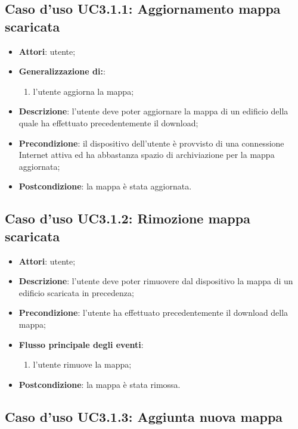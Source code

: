 \documentclass[../AnalisiDeiRequisiti.tex]{subfiles}
\begin{document}
\subsection{Caso d'uso UC3.1.1: Aggiornamento mappa scaricata}
\begin{itemize}
\item \textbf{Attori}: utente;

        \item \textbf{Generalizzazione di:}:
          \begin{enumerate}
          \item l'utente aggiorna la mappa;

      \end{enumerate}
\item \textbf{Descrizione}: l'utente deve poter aggiornare la mappa di un edificio della quale ha effettuato precedentemente il download; 
      \item \textbf{Precondizione}: il dispositivo dell'utente è provvisto di una connessione Internet attiva ed ha abbastanza spazio di archiviazione per la mappa aggiornata;
    \item \textbf{Postcondizione}: la mappa è stata aggiornata.
  \end{itemize}
\hypertarget{UC3.1.2}{}
\subsection{Caso d'uso UC3.1.2: Rimozione mappa scaricata}

\begin{itemize}
\item \textbf{Attori}: utente;
\item \textbf{Descrizione}: l'utente deve poter rimuovere dal dispositivo la mappa di un edificio scaricata in precedenza; 
      \item \textbf{Precondizione}: l'utente ha effettuato precedentemente il download della mappa;

        \item \textbf{Flusso principale degli eventi}:
          \begin{enumerate}
          \item l'utente rimuove la mappa;

      \end{enumerate}
    \item \textbf{Postcondizione}: la mappa è stata rimossa.
  \end{itemize}
\hypertarget{UC3.1.3}{}
\subsection{Caso d'uso UC3.1.3: Aggiunta nuova mappa}
\end{document}
